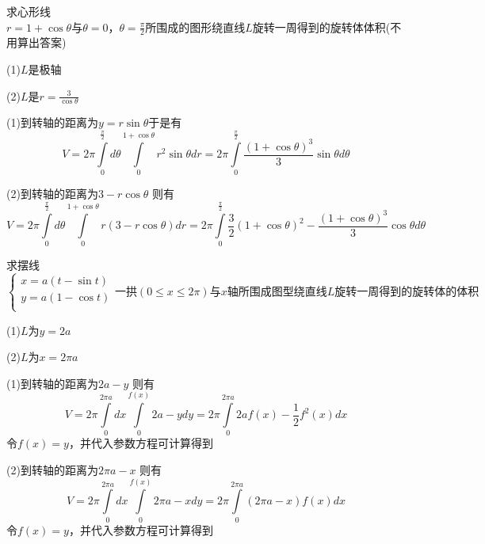 \documentclass[lang=cn,10pt]{elegantbook}
\begin{document}
\begin{example}
	求心形线$r=1+\cos \theta \text{与}\theta =0\text{，}\theta =\frac{\pi}{2}\text{所围成的图形绕直线}L\text{旋转一周得到的旋转体体积}
	$(不用算出答案)
	
	(1)$L$是极轴
	
	(2)$L$是$r=\frac{3}{\cos \theta}$
\end{example}
\begin{solution}
	
	(1)到转轴的距离为$y=r\sin \theta $于是有
	\begin{equation*}
		V=2\pi\int\limits_0^{\frac{\pi}{2}}{d\theta}\int\limits_0^{1+\cos \theta}{r^2\sin \theta}dr=2\pi\int\limits_0^{\frac{\pi}{2}}{\frac{\left( 1+\cos \theta \right) ^3}{3}\sin \theta d\theta}
	\end{equation*}
	
	(2)到转轴的距离为$3-r\cos \theta $
	则有
	\begin{equation*}
		V=2\pi \int\limits_0^{\frac{\pi}{2}}{d\theta}\int\limits_0^{1+\cos \theta}{r\left( 3-r\cos \theta \right)}dr=2\pi \int\limits_0^{\frac{\pi}{2}}{\frac{3}{2}\left( 1+\cos \theta \right) ^2-\frac{\left( 1+\cos \theta \right) ^3}{3}\cos \theta d\theta}
	\end{equation*}
\end{solution}
\begin{example}
	求摆线$\begin{cases}
		x=a\left( t-\sin t \right)\\
		y=a\left( 1-\cos t \right)\\
	\end{cases}\text{一拱}\left( 0\le x\le 2\pi \right) \text{与}x\text{轴所围成图型绕直线}L\text{旋转一周得到的旋转体的体积}$
	
	(1)$L$为$y=2a$
	
	(2)$L$为$x=2\pi a$
		
\end{example}
\begin{solution}
	
	(1)到转轴的距离为$2a-y$
	则有
	\begin{equation*}
		V=2\pi \int\limits_0^{2\pi a}{dx}\int\limits_0^{f\left( x \right)}{2a-}ydy=2\pi \int\limits_0^{2\pi a}{2af\left( x \right) -\frac{1}{2}f^2\left( x \right) dx}
	\end{equation*}
	令$f(x)=y$，并代入参数方程可计算得到
	
	(2)到转轴的距离为$2\pi a-x$
	则有
	\begin{equation*}
		V=2\pi \int\limits_0^{2\pi a}{dx}\int\limits_0^{f\left( x \right)}{2\pi a-}xdy=2\pi \int\limits_0^{2\pi a}{\left( 2\pi a-x \right) f\left( x \right) dx}
	\end{equation*}
	令$f(x)=y$，并代入参数方程可计算得到
\end{solution}
\end{document}
